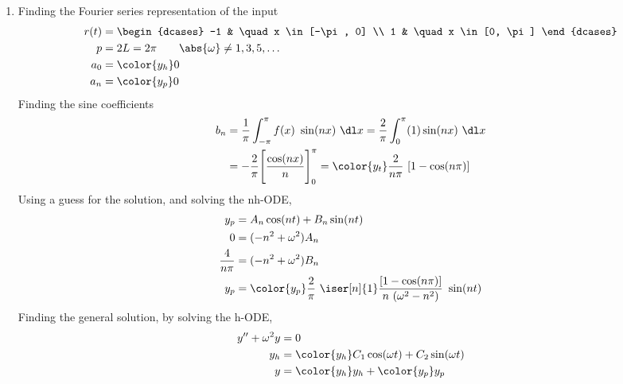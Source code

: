 \begin{enumerate}
    \item Finding the Fourier series representation of the input
          \begin{align}
              r(t) & = \begin{dcases}
                           -1 & \quad x \in [-\pi, 0] \\
                           1  & \quad x \in [0, \pi]
                       \end{dcases}                     \\
              p    & = 2L = 2\pi \qquad \abs{\omega} \neq 1,3,5,\dots \\
              a_0  & = \color{y_h} 0                                  \\
              a_n  & = \color{y_p} 0
          \end{align}
          Finding the sine coefficients
          \begin{align}
              b_n & = \frac{1}{\pi} \int_{-\pi}^{\pi} f(x) \ \sin(nx)\ \dl x
              = \frac{2}{\pi} \int_{0}^{\pi} (1) \sin(nx)\ \dl x               \\
                  & = -\frac{2}{\pi}\Bigg[ \frac{\cos(nx)}{n} \Bigg]_{0}^{\pi}
              = \color{y_t} \frac{2}{n\pi}\ [1 - \cos(n\pi)]
          \end{align}
          Using a guess for the solution, and solving the nh-ODE,
          \begin{align}
              y_p            & = A_n \cos(nt) + B_n \sin(nt) \\
              0              & = (-n^2 + \omega^2)A_n        \\
              \frac{4}{n\pi} & = (-n^2 + \omega^2)B_n        \\
              y_p            & = \color{y_p} \frac{2}{\pi}
              \ \iser[n]{1} \frac{[1 - \cos(n\pi)]}{n\ (\omega^2 - n^2)} \ \sin(nt)
          \end{align}
          Finding the general solution, by solving the h-ODE,
          \begin{align}
              y'' + \omega^2 y & = 0                                                   \\
              y_h              & = \color{y_h} C_1 \cos(\omega t) + C_2 \sin(\omega t) \\
              y                & = {\color{y_h} y_h} + {\color{y_p} y_p}
          \end{align}


\end{enumerate}
